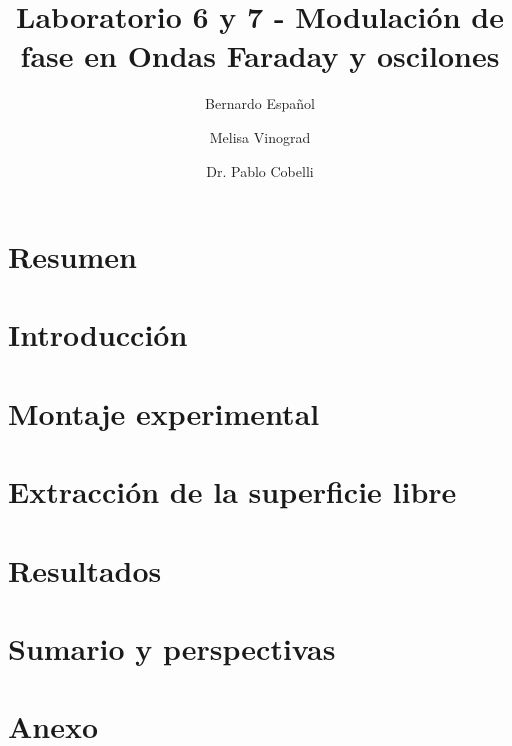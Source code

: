 \documentclass[onecolumn, amsmath, amssymb, aps]{revtex4-2}
\begin{document}


\title{Laboratorio 6 y 7 - Modulación de fase en Ondas Faraday y oscilones}
\author{Bernardo Español}

\author{Melisa Vinograd}


\author{Dr. Pablo Cobelli}

\section*{Resumen}


\section{Introducción}


\section{Montaje experimental}


\section{Extracción de la superficie libre}


\section{Resultados}


\section{Sumario y perspectivas}


\section*{Anexo}






\end{document}
